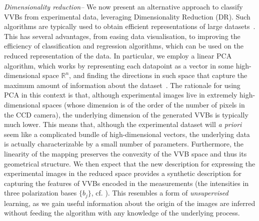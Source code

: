 \documentclass[
	aps, prl, superscriptaddress, twocolumn,
	10pt
	floatfix, 
    nofootinbib,
	tightenlines
]{revtex4-1}
\begin{document}
\emph{Dimensionality reduction--}
We now present an alternative approach to classify {\acp{VVB}} from experimental data, 
leveraging  Dimensionality Reduction ({\ac{DR})}.
Such algorithms are typically used to obtain efficient representations of large datasets~\cite{cunningham2008dimension,fodor2002survey}.
This has several advantages, from easing data visualisation, to improving the efficiency of classification and regression algorithms, which can be used on the reduced representation of the data.
In particular, we employ a linear 
{\ac{PCA} algorithm, which} works by representing each datapoint as a vector in some high-dimensional space $\mathbb R^n$, and finding the directions in such space that capture the maximum amount of information about the dataset~\cite{jolliffe2011principal,jolliffe2016principal}.
The rationale for using {\ac{PCA}} in this context is that, although experimental images live in extremely high-dimensional spaces (whose dimension is of the order of the number of pixels in the CCD camera), the underlying dimension of the generated {\acp{VVB}} is typically much lower.
This means that, although the experimental dataset will \emph{a priori} seem like a complicated bundle of high-dimensional vectors, the underlying data is actually characterizable by a small number of parameters. Furthermore, the linearity of the mapping preserves the convexity of the VVB space and thus its geometrical structure. We then expect that the new description for expressing the experimental images in the reduced space provides a synthetic description for capturing the features of VVBs encoded in the measurements (the intensities in three polarization bases $\{b_j\}$, cf. \mbox{\cite{SI}}).
This resembles a form of \emph{unsupervised} learning, as we gain useful information about the origin of the images are inferred without feeding the algorithm with any knowledge of the underlying process.
 
\end{document}
